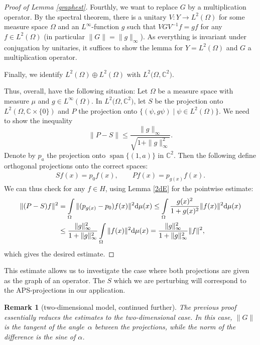 \documentclass[pdftex]{sigma}
\numberwithin{equation}{section}
\newtheorem{Remark}[Theorem]{Remark} }
\DeclareMathOperator{\spann}{span}
\begin{document}
\begin{proof}[Proof of Lemma \ref{graphest}]
		Fourthly, we want to replace $G$ by a multiplication operator. By the spectral theorem, there is a unitary $V\colon Y\to L^2(\Omega)$ for some measure space $\Omega$ and an $L^\infty$-function $g$ such that $VGV^{-1}f=gf$ for any $f\in L^2(\Omega)$ (in particular $\|G\|=\|g\|_\infty$). As everything is invariant under conjugation by unitaries, it suffices to show the lemma for $Y=L^2(\Omega)$ and $G$ a multiplication operator.
		
		Finally, we identify $L^2(\Omega)\oplus L^2(\Omega)$ with $L^2\bigl(\Omega,\mathbb{C}^2\bigr)$.
		
		Thus, overall, have the following situation: Let $\Omega$ be a measure space with measure $\mu$ and $g\in L^\infty(\Omega)$. In $L^2\bigl(\Omega, \mathbb{C}^2\bigr)$, let $S$ be the projection onto $L^2(\Omega,\mathbb{C}\times\{0\})$ and $P$ the projection onto $\bigl\{(\psi,g\psi)\mid \psi\in L^2(\Omega)\bigr\}$. We need to show the inequality
		\[
        \|P-S\|\leq \frac{\|g\|_\infty}{\sqrt{1+\|g\|_\infty^2}}.
        \]
		Denote by $p_a$ the projection onto $\spann\{(1,a)\}$ in $\mathbb{C}^2$. Then the following define orthogonal projections onto the correct spaces:
		\begin{gather*}
        Sf(x)=p_0f(x),\qquad
        Pf(x)=p_{g(x)}f(x).
        \end{gather*}
		We can thus check for any $f\in H$, using Lemma \ref{2dE} for the pointwise estimate:
		\begin{align*}
			\|(P-S)f\|^2
			&=\int\limits_\Omega\|(p_{g(x)}-p_0)f(x)\|^2{\rm d}\mu(x)
			 \leq\int\limits_\Omega\frac{g(x)^2}{1+g(x)^2}\|f(x)\|^2{\rm d}\mu(x)\\
			&\leq\frac{\|g\|_\infty^2}{1+\|g\|_\infty^2}\int\limits_\Omega\|f(x)\|^2{\rm d}\mu(x)
			 =\frac{\|g\|_\infty^2}{1+\|g\|_\infty^2}\|f\|^2,
		\end{align*}
		which gives the desired estimate.
	\end{proof}
	
	This estimate allows us to investigate the case where both projections are given as the graph of an operator. The $S$ which we are perturbing will correspond to the APS-projections in our application.
	\begin{Remark}[two-dimensional model, continued further]
		The previous proof essentially reduces the estimates to the two-dimensional case. In this case, $\|G\|$ is the tangent of the angle~$\alpha$ between the projections, while the norm of the difference is the sine of $\alpha$.
			\end{Remark}
\end{document}
